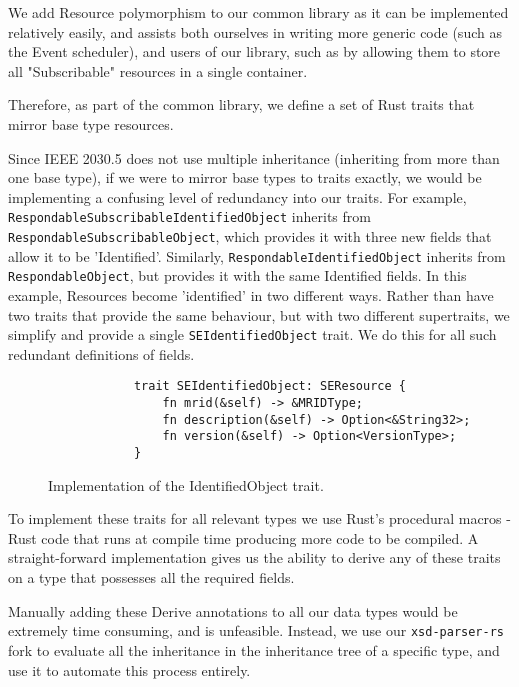 We add Resource polymorphism to our common library as it can be implemented relatively easily, and assists both ourselves in writing more generic code (such as the Event scheduler), and users of our library, such as by allowing them to store all "Subscribable" resources in a single container.

Therefore, as part of the common library, we define a set of Rust traits that mirror base type resources. 

Since IEEE 2030.5 does not use multiple inheritance (inheriting from more than one base type), if we were to mirror base types to traits exactly, we would be implementing a confusing level of redundancy into our traits.
For example, \texttt{RespondableSubscribableIdentifiedObject} inherits from \texttt{RespondableSubscribableObject}, which provides it with three new fields that allow it to be 'Identified'. Similarly, \texttt{RespondableIdentifiedObject} inherits from \texttt{RespondableObject}, but provides it with the same Identified fields. In this example, Resources become 'identified' in two different ways. Rather than have two traits that provide the same behaviour, but with two different supertraits, we simplify and provide a single \texttt{SEIdentifiedObject} trait. We do this for all such redundant definitions of fields.

\begin{figure}[H]
    \begin{center}
        \begin{lstlisting}
            trait SEIdentifiedObject: SEResource {
                fn mrid(&self) -> &MRIDType;
                fn description(&self) -> Option<&String32>;
                fn version(&self) -> Option<VersionType>;
            }
        \end{lstlisting}
        \label{fig:identtrait}
        \caption{Implementation of the IdentifiedObject trait.}
    \end{center}
\end{figure}

To implement these traits for all relevant types we use Rust's procedural macros - Rust code that runs at compile time producing more code to be compiled. A straight-forward implementation gives us the ability to derive any of these traits on a type that possesses all the required fields.

Manually adding these Derive annotations to all our data types would be extremely time consuming, and is unfeasible. Instead, we use our \texttt{xsd-parser-rs} fork to evaluate all the inheritance in the inheritance tree of a specific type, and use it to automate this process entirely. 

